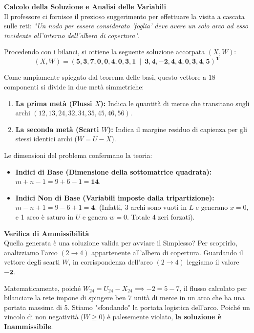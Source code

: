 \documentclass[12pt, a4paper]{article}
\begin{document}
	\vspace{0.4cm}
	\textbf{Calcolo della Soluzione e Analisi delle Variabili}\\
	Il professore ci fornisce il prezioso suggerimento per effettuare la visita a cascata sulle reti: \textit{"Un nodo per essere considerato 'foglia' deve avere un solo arco ad esso incidente all'interno dell'albero di copertura"}. 
	
	Procedendo con i bilanci, si ottiene la seguente soluzione accorpata $(X, W)$:
	\[
	(X, W) = \mathbf{(5, 3, 7, 0, 0, 4, 0, 3, 1 \ \mid \ 3, 4, -2, 4, 4, 0, 3, 4, 5)^T}
	\]
	
	Come ampiamente spiegato dal teorema delle basi, questo vettore a $18$ componenti si divide in due metà simmetriche:
	\begin{enumerate}
		\item \textbf{La prima metà (Flussi $X$):} Indica le quantità di merce che transitano sugli archi $(12, 13, 24, 32, 34, 35, 45, 46, 56)$.
		\item \textbf{La seconda metà (Scarti $W$):} Indica il margine residuo di capienza per gli stessi identici archi ($W = U - X$).
	\end{enumerate}
	
	Le dimensioni del problema confermano la teoria:
	\begin{itemize}[label=$\circ$, itemsep=2pt, leftmargin=1.5cm]
		\item \textbf{Indici di Base (Dimensione della sottomatrice quadrata):} $m + n - 1 = 9 + 6 - 1 = \mathbf{14}$. 
		\item \textbf{Indici Non di Base (Variabili imposte dalla tripartizione):} $m - n + 1 = 9 - 6 + 1 = \mathbf{4}$. (Infatti, 3 archi sono vuoti in $L$ e generano $x=0$, e 1 arco è saturo in $U$ e genera $w=0$. Totale 4 zeri forzati).
	\end{itemize}
	
	\vspace{0.4cm}
	\textbf{Verifica di Ammissibilità}\\
	Quella generata è una soluzione valida per avviare il Simplesso?
	Per scoprirlo, analizziamo l'arco $(2\to4)$ appartenente all'albero di copertura. Guardando il vettore degli scarti $W$, in corrispondenza dell'arco $(2\to4)$ leggiamo il valore $\mathbf{-2}$.
	
	Matematicamente, poiché $W_{24} = U_{24} - X_{24} \implies -2 = 5 - 7$, il flusso calcolato per bilanciare la rete impone di spingere ben 7 unità di merce in un arco che ha una portata massima di 5. Stiamo "sfondando" la portata logistica dell'arco.
	Poiché un vincolo di non negatività ($W \ge 0$) è palesemente violato, \textbf{la soluzione è Inammissibile}. 
	
\end{document}
